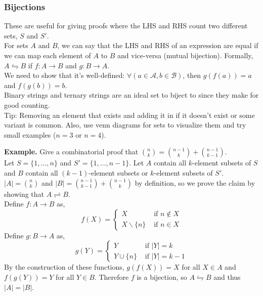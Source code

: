 \documentclass[11pt]{article}
\newenvironment{eg}[1]{
\begin{tcolorbox}[colback = white!15, arc=0pt,outer arc=0pt, colframe = black]
{\color{black} \textbf{Example.} #1} \\[5pt]
}
{
\end{tcolorbox}
}
\newcommand{\nl}{\\[5pt]}
\begin{document}
\subsubsection{Bijections}
These are useful for giving proofs where the LHS and RHS count two different sets, $S$ and $S'$. \nl
For sets $A$ and $B$, we can say that the LHS and RHS of an expression are equal if we can map each element of $A$ to $B$ and vice-versa (mutual bijection). Formally, $A \leftrightharpoons B$ if $f: A \rightarrow B$ and $g: B \rightarrow A$. \nl
We need to show that it's well-defined: $\forall(a \in \mathcal{A}, b \in \mathcal{B})$, then $g(f(a)) = a$ and $f(g(b)) = b$.\nl
Binary strings and ternary strings are an ideal set to biject to since they make for good counting. \nl 
Tip: Removing an element that exists and adding it in if it doesn't exist or some variant is common. Also, use venn diagrams for sets to visualize them and try small examples ($n = 3$ or $n = 4$). \vspace{-2pt}
\begin{eg}{Give a combinatorial proof that $\binom{n}{k} = \binom{n-1}{k} + \binom{n-1}{k-1}$.}
Let $S = \{1, \dots, n\}$ and $S' = \{1, \dots, n-1\}$. Let $A$ contain all $k$-element subsets of $S$ and $B$ contain all $(k-1)$-element subsets or $k$-element subsets of $S'$. $|A| = \binom{n}{k}$ and $|B| = \binom{n-1}{k-1} + \binom{n-1}{k}$ by definition, so we prove the claim by showing that $A \rightleftharpoons B$. \nl 
Define $f: A \rightarrow B$ as, 
$$f(X) = \begin{cases}
X &\text{ if } n \not\in X\\
X \backslash \{n\} &\text{ if } n \in X
\end{cases}$$
Define $g: B \rightarrow A$ as, 
$$g(Y) = \begin{cases}
Y &\text{ if } |Y| = k\\
Y \cup \{n\} &\text{ if } |Y| = k - 1
\end{cases}$$
By the construction of these functions, $g(f(X)) = X$ for all $X \in A$ and $f(g(Y)) = Y$ for all $Y \in B$. Therefore $f$ is a bijection, so $A \leftrightharpoons B$ and thus $|A| = |B|$.

\end{eg}

\end{document}
